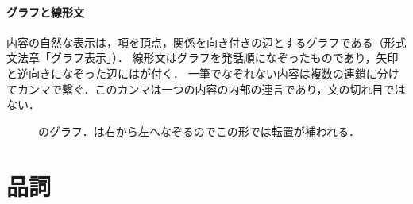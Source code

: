 \documentclass[../../main-detail.tex]{subfiles}
\begin{document}
\paragraph{グラフと線形文}
内容の自然な表示は，項を頂点，関係を向き付きの辺とするグラフである（形式文法章「グラフ表示」）．
線形文はグラフを発話順になぞったものであり，矢印と逆向きになぞった辺にはが付く．
一筆でなぞれない内容は複数の連鎖に分けてカンマで繋ぐ．このカンマは一つの内容の内部の連言であり，文の切れ目ではない．
\begin{figure}[H]
    \centering
    \caption{のグラフ．は右から左へなぞるのでこの形では転置が補われる．}
\end{figure}

\section{品詞}\label{sec:practice-pos}
\end{document}
